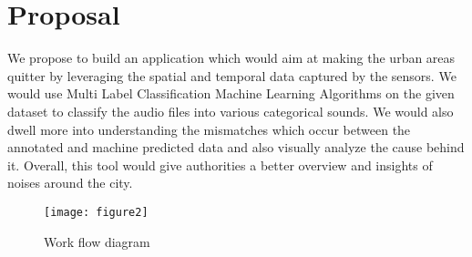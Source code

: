 	\section{Proposal}
	We propose to build an application which would aim at making the urban areas quitter by leveraging the spatial and temporal data captured by the sensors. We would use Multi Label Classification Machine Learning Algorithms on the given dataset to classify the audio files into various categorical sounds. We would also dwell more into understanding the mismatches which occur between the annotated and machine predicted data and also visually analyze the cause behind it.  Overall, this tool would give authorities a better overview and insights of noises around the city.
	\begin{figure}[h!]
	
	\texttt{[image: figure2]}
	\caption{ Work flow diagram}
	\end{figure}
	
	
